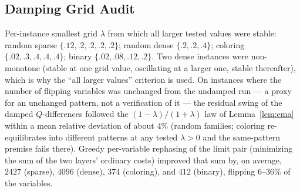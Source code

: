 \subsection{Damping Grid Audit}

Per-instance smallest grid $\lambda$ from which all larger tested values
were stable: random sparse $\{.12, .2, .2, .2, .2\}$; random dense
$\{.2, .2, .4\}$; coloring $\{.02, .3, .4, .4, .4\}$; binary
$\{.02, .08, .12, .2\}$.  Two dense instances were non-monotone (stable
at one grid value, oscillating at a larger one, stable thereafter),
which is why the ``all larger values'' criterion is used.  On instances
where the number of flipping variables was unchanged from the undamped
run --- a proxy for an unchanged pattern, not a verification of it ---
the residual swing of the damped $Q$-differences followed the
$(1-\lambda)/(1+\lambda)$ law of Lemma~\ref{lem:ema} within a mean
relative deviation of about $4\%$ (random families; coloring
re-equilibrates into different patterns at any tested $\lambda > 0$ and
the same-pattern premise fails there).  Greedy per-variable rephasing of
the limit pair (minimizing the sum of the two layers' ordinary costs)
improved that sum by, on average, $2427$ (sparse), $4096$ (dense),
$374$ (coloring), and $412$ (binary), flipping $6$--$36\%$ of the
variables.
